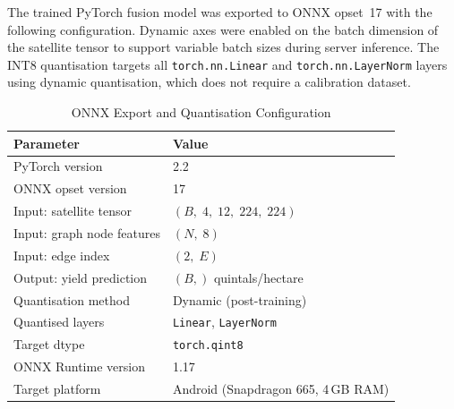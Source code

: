 The trained PyTorch fusion model was exported to ONNX opset~17 with the following configuration. Dynamic axes were enabled on the batch dimension of the satellite tensor to support variable batch sizes during server inference. The INT8 quantisation targets all \texttt{torch.nn.Linear} and \texttt{torch.nn.LayerNorm} layers using dynamic quantisation, which does not require a calibration dataset.

\begin{table}[H]
\centering
\caption{ONNX Export and Quantisation Configuration}
\label{tab:onnx_config}
\begin{tabular}{|l|l|}
\hline
\textbf{Parameter}           & \textbf{Value}                        \\
\hline
PyTorch version              & 2.2                                   \\
ONNX opset version           & 17                                    \\
Input: satellite tensor      & $(B,\;4,\;12,\;224,\;224)$            \\
Input: graph node features   & $(N,\;8)$                             \\
Input: edge index            & $(2,\;E)$                             \\
Output: yield prediction     & $(B,)$ quintals/hectare               \\
Quantisation method          & Dynamic (post-training)               \\
Quantised layers             & \texttt{Linear}, \texttt{LayerNorm}   \\
Target dtype                 & \texttt{torch.qint8}                  \\
ONNX Runtime version         & 1.17                                  \\
Target platform              & Android (Snapdragon 665, 4\,GB RAM)   \\
\hline
\end{tabular}
\end{table}
